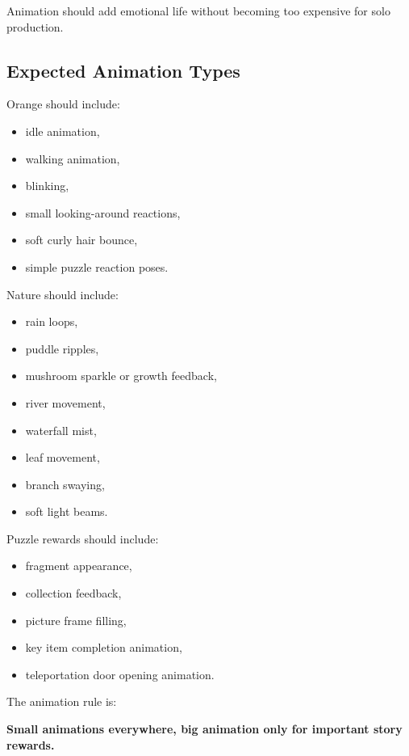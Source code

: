 \documentclass[12pt]{article}
\begin{document}
Animation should add emotional life without becoming too expensive for solo production.

\subsection{Expected Animation Types}

Orange should include:

\begin{itemize}[leftmargin=*]
    \item idle animation,
    \item walking animation,
    \item blinking,
    \item small looking-around reactions,
    \item soft curly hair bounce,
    \item simple puzzle reaction poses.
\end{itemize}

Nature should include:

\begin{itemize}[leftmargin=*]
    \item rain loops,
    \item puddle ripples,
    \item mushroom sparkle or growth feedback,
    \item river movement,
    \item waterfall mist,
    \item leaf movement,
    \item branch swaying,
    \item soft light beams.
\end{itemize}

Puzzle rewards should include:

\begin{itemize}[leftmargin=*]
    \item fragment appearance,
    \item collection feedback,
    \item picture frame filling,
    \item key item completion animation,
    \item teleportation door opening animation.
\end{itemize}

The animation rule is:

\begin{center}
\textbf{Small animations everywhere, big animation only for important story rewards.}
\end{center}
\end{document}
